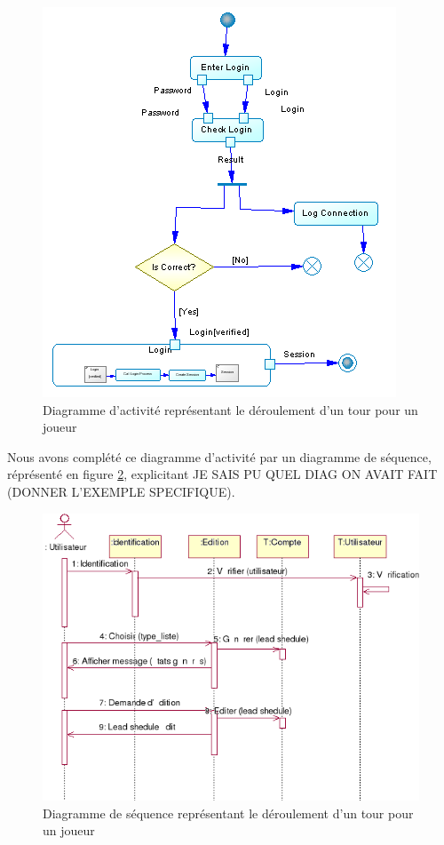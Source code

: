 \begin{figure}[!h] 
\centerline{\includegraphics[scale=0.30]{img/activite_jeu_ex.png}}
   \caption{\label{étiquette} Diagramme d'activité représentant le déroulement d'un tour pour un joueur}
\label{activiteJeu}
\end{figure}

Nous avons complété ce diagramme d'activité par un diagramme de séquence, réprésenté en figure \ref{sequenceJeu}, explicitant JE SAIS PU QUEL DIAG ON AVAIT FAIT (DONNER L'EXEMPLE SPECIFIQUE).

\begin{figure}[!h] 
\centerline{\includegraphics[scale=0.30]{img/sequence_jeu_ex.png}}
   \caption{\label{étiquette} Diagramme de séquence représentant le déroulement d'un tour pour un joueur}
\label{sequenceJeu}
\end{figure}

